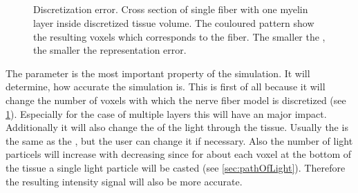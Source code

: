 \subsection{\Voxelsize}
%
\begin{figure}[!t]
\centering
\setlength{\tikzwidth}{.24\textwidth}

\caption[Discretization error]{Discretization error. Cross section of single fiber with one myelin layer inside discretized tissue volume. The couloured pattern show the resulting voxels which corresponds to the fiber. The smaller the \Voxelsize{}, the smaller the representation error.}
\label{fig:vectorfield_disc_error}
\end{figure}
%
The \Voxelsize{} parameter is the most important property of the simulation.
It will determine, how accurate the simulation is.
This is first of all because it will change the number of voxels with which the nerve fiber model is discretized (see \cref{fig:vectorfield_disc_error}).
Especially for the case of multiple layers this will have an major impact.
Additionally it will also change the \Stepsize{} of the light through the tissue.
Usually the \Stepsize{} is the same as the \Voxelsize{}, but the user can change it if necessary.
Also the number of light particels will increase with decreasing \Voxelsize{} since for about each voxel at the bottom of the tissue a single light particle will be casted (see \cref{sec:pathOfLight}).
Therefore the resulting intensity signal will also be more accurate.
%
%
% 

